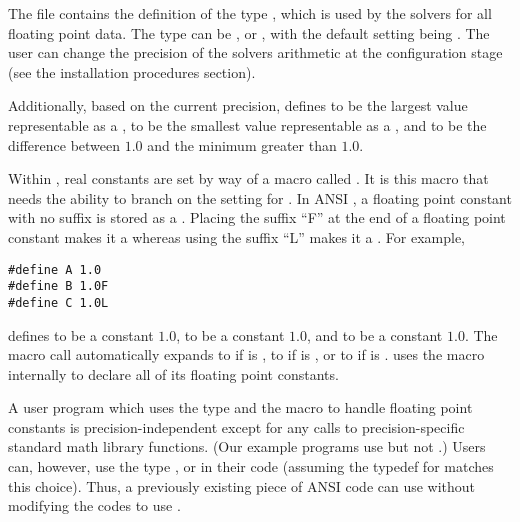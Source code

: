 %
The  file contains the definition of the type ,
which is used by the {\sundials} solvers for all floating point data.
The type  can be ,  or , with
the default setting being .
The user can change the precision of the {\sundials} solvers arithmetic at the
configuration stage (see the {\sundials} installation procedures section).

Additionally, based on the current precision,  defines 
 to be the largest value representable as a , 
to be the smallest value representable as a , and
 to be the difference between $1.0$ and the minimum 
greater than $1.0$.

Within {\sundials}, real constants are set by way of a macro called
.  It is this macro that needs the ability to branch on the
setting for .  In ANSI {\C}, a floating point constant with no
suffix is stored as a .  Placing the suffix ``F'' at the
end of a floating point constant makes it a  whereas using the suffix
``L'' makes it a .  For example,
\begin{verbatim}
#define A 1.0
#define B 1.0F
#define C 1.0L
\end{verbatim}
defines  to be a  constant $1.0$,  to be a
 constant $1.0$, and  to be a  constant
$1.0$.  The macro call  automatically expands to 
if  is , to  if  is ,
or to  if  is .  {\sundials} uses the
 macro internally to declare all of its floating point constants. 

A user program which uses the type  and the  macro
to handle floating point constants is precision-independent except for
any calls to precision-specific standard math library
functions.  (Our example programs use  but not
.)  Users can, however, use the type ,  or
 in their code (assuming the typedef for  matches
this choice).  Thus, a previously existing piece of ANSI {\C} code can use
{\sundials} without modifying the codes to use .
